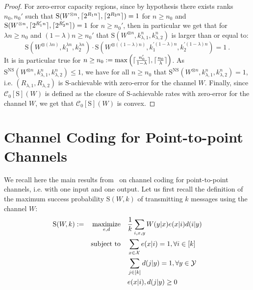 \begin{proof}
For zero-error capacity regions, since by hypothesis there exists ranks $n_0,n_0'$ such that $\mathrm{S}(W^{\otimes n},\lceil2^{R_1n}\rceil,\lceil2^{R_2n}\rceil) = 1$ for $n \geq n_0$ and $\mathrm{S}(W^{\otimes n},\lceil2^{R_1'n}\rceil,\lceil2^{R_2'n}\rceil) = 1$ for $n \geq n_0'$, then in particular we get that for $\lambda n \geq n_0$ and $(1-\lambda) n \geq n_0'$ that $\mathrm{S}(W^{\otimes n},k^n_{\lambda,1},k^n_{\lambda, 2})$ is larger than or equal to:
\[ \mathrm{S}(W^{\otimes (\lambda n)}, k_1^{\lambda n}, k_2^{\lambda n}) \cdot \mathrm{S}(W^{\otimes ((1-\lambda) n)}, k_1^{\prime (1-\lambda) n}, k_2^{\prime (1-\lambda) n}) = 1 \ .\]
It is in particular true for $n \geq n_0 := \max\left(\lceil\frac{n_0'}{1-\lambda}\rceil,\lceil\frac{n_0}{\lambda}\rceil\right)$. As $\mathrm{S}^{\mathrm{NS}}(W^{\otimes n},k^n_{\lambda,1},k^n_{\lambda,2}) \leq 1$, we have  for all $n \geq n_0$ that $\mathrm{S}^{\mathrm{NS}}(W^{\otimes n},k^n_{\lambda,1},k^n_{\lambda,2}) = 1$, i.e. $(R_{\lambda,1},R_{\lambda,2})$ is $\mathrm{S}$-achievable with zero-error for the channel $W$.  Finally, since $\mathcal{C}_0[\mathrm{S}](W)$ is defined as the closure of $\mathrm{S}$-achievable rates with zero-error for the channel $W$, we get that $\mathcal{C}_0[\mathrm{S}](W)$ is convex.
\end{proof}
 
\section{Channel Coding for Point-to-point Channels}
\label{subsection:onewaychannelcoding} 
We recall here the main results from~\cite{BF18} on channel coding for point-to-point channels, i.e. with one input and one output. Let us first recall the definition of the maximum success probability $\mathrm{S}(W,k)$ of transmitting $k$ messages using the channel $W$:
\begin{equation}
  \begin{aligned}
    \mathrm{S}(W,k) := &&\underset{e,d}{\operatorname{\text{maximize}}} &&& \frac{1}{k} \sum_{i,x,y} W(y|x)e(x|i)d(i|y)\\
    &&\operatorname{\text{subject to}} &&& \sum_{x \in \mathcal{X}} e(x|i) = 1, \forall i \in [k]\\
    &&&&& \sum_{j \in [k]} d(j|y) = 1, \forall y \in \mathcal{Y}\\
    &&&&& e(x|i), d(j|y) \geq 0
  \end{aligned}
\end{equation}

